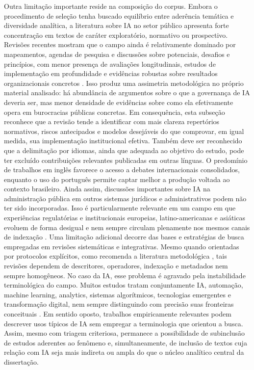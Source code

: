 \documentclass[12pt,a4paper]{article}
\begin{document}
Outra limitação importante reside na composição do corpus. Embora o procedimento de seleção tenha buscado equilíbrio entre aderência temática e diversidade analítica, a literatura sobre IA no setor público apresenta forte concentração em textos de caráter exploratório, normativo ou prospectivo. Revisões recentes mostram que o campo ainda é relativamente dominado por mapeamentos, agendas de pesquisa e discussões sobre potenciais, desafios e princípios, com menor presença de avaliações longitudinais, estudos de implementação em profundidade e evidências robustas sobre resultados organizacionais concretos \autocite{madan2022ai} \autocite{serra2024a} \autocite{alhosani2024opportunities}. Isso produz uma assimetria metodológica no próprio material analisado: há abundância de argumentos sobre o que a governança de IA deveria ser, mas menor densidade de evidências sobre como ela efetivamente opera em burocracias públicas concretas. Em consequência, esta subseção reconhece que a revisão tende a identificar com mais clareza repertórios normativos, riscos antecipados e modelos desejáveis do que comprovar, em igual medida, sua implementação institucional efetiva.
Também deve ser reconhecido que a delimitação por idiomas, ainda que adequada ao objetivo do estudo, pode ter excluído contribuições relevantes publicadas em outras línguas. O predomínio de trabalhos em inglês favorece o acesso a debates internacionais consolidados, enquanto o uso do português permite captar melhor a produção voltada ao contexto brasileiro. Ainda assim, discussões importantes sobre IA na administração pública em outros sistemas jurídicos e administrativos podem não ter sido incorporadas. Isso é particularmente relevante em um campo em que experiências regulatórias e institucionais europeias, latino-americanas e asiáticas evoluem de forma desigual e nem sempre circulam plenamente nos mesmos canais de indexação \autocite{batool2025ai} \autocite{sigfrids2022how}.
Uma limitação adicional decorre das bases e estratégias de busca empregadas em revisões sistemáticas e integrativas. Mesmo quando orientadas por protocolos explícitos, como recomenda a literatura metodológica \autocite{prisma2020statement}, tais revisões dependem de descritores, operadores, indexação e metadados nem sempre homogêneos. No caso da IA, esse problema é agravado pela instabilidade terminológica do campo. Muitos estudos tratam conjuntamente IA, automação, machine learning, analytics, sistemas algorítmicos, tecnologias emergentes e transformação digital, nem sempre distinguindo com precisão suas fronteiras conceituais \autocite{pi2021machine} \autocite{lyrio2025emerging}. Em sentido oposto, trabalhos empiricamente relevantes podem descrever usos típicos de IA sem empregar a terminologia que orientou a busca. Assim, mesmo com triagem criteriosa, permanece a possibilidade de subinclusão de estudos aderentes ao fenômeno e, simultaneamente, de inclusão de textos cuja relação com IA seja mais indireta ou ampla do que o núcleo analítico central da dissertação.
\end{document}
